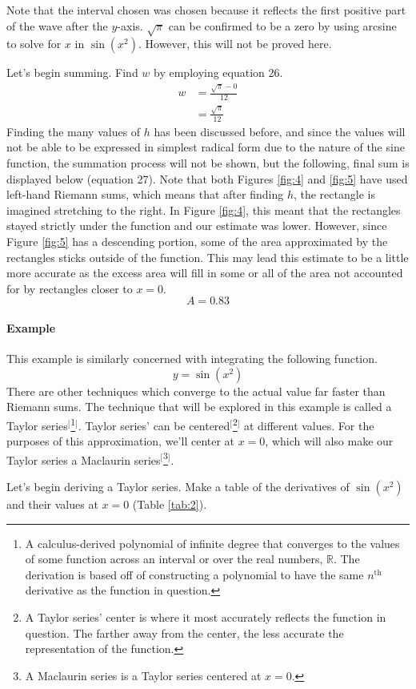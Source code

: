 \documentclass{article}
\newcounter{example}%
\newcommand{\ex}{\stepcounter{example} \paragraph{Example \theexample}}
\begin{document}
Note that the interval chosen was chosen because it reflects the first positive part of the wave after the $y$-axis. $\sqrt{\pi}$ can be confirmed to be a zero by using arcsine to solve for $x$ in $\sin(x^2)$. However, this will not be proved here.\par
Let's begin summing. Find $w$ by employing equation 26.
\begin{align*}
    w &= \frac{\sqrt{\pi}-0}{12}\\
    &= \frac{\sqrt{\pi}}{12}
\end{align*}
Finding the many values of $h$ has been discussed before, and since the values will not be able to be expressed in simplest radical form due to the nature of the sine function, the summation process will not be shown, but the following, final sum is displayed below (equation 27). Note that both Figures \ref{fig:4} and \ref{fig:5} have used left-hand Riemann sums, which means that after finding $h$, the rectangle is imagined stretching to the right. In Figure \ref{fig:4}, this meant that the rectangles stayed strictly under the function and our estimate was lower. However, since Figure \ref{fig:5} has a descending portion, some of the area approximated by the rectangles sticks outside of the function. This may lead this estimate to be a little more accurate as the excess area will fill in some or all of the area not accounted for by rectangles closer to $x=0$.
\begin{equation}
    A=0.83
\end{equation}
\ex This example is similarly concerned with integrating the following function.$$y=\sin(x^2)$$
There are other techniques which converge to the actual value far faster than Riemann sums. The technique that will be explored in this example is called a Taylor series$^[$\footnote{A calculus-derived polynomial of infinite degree that converges to the values of some function across an interval or over the real numbers, $\mathbb{R}$. The derivation is based off of constructing a polynomial to have the same $n^\text{th}$ derivative as the function in question.}$^]$. Taylor series' can be centered$^[$\footnote{A Taylor series' center is where it most accurately reflects the function in question. The farther away from the center, the less accurate the representation of the function.}$^]$ at different values. For the purposes of this approximation, we'll center at $x=0$, which will also make our Taylor series a Maclaurin series$^[$\footnote{A Maclaurin series is a Taylor series centered at $x=0$.}$^]$.\par
Let's begin deriving a Taylor series. Make a table of the derivatives of $\sin(x^2)$ and their values at $x=0$ (Table \ref{tab:2}).
\end{document}
